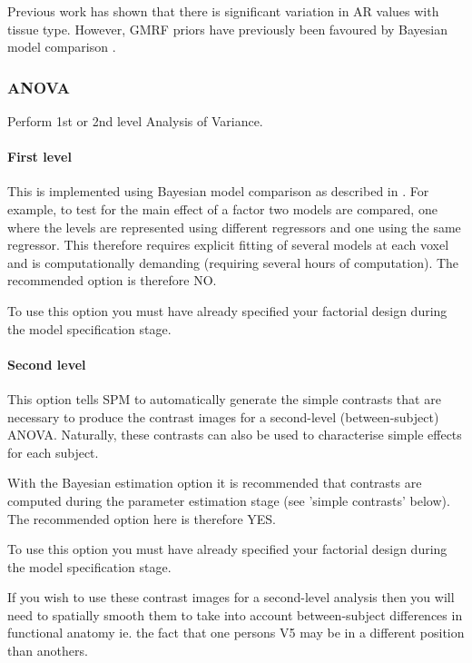 Previous work has shown that there is significant variation in AR values with tissue type. However, GMRF priors have previously been favoured by Bayesian model comparison \cite{will_bayes_srglm}.

\subsubsection{ANOVA}

Perform 1st or 2nd level Analysis of Variance.

\paragraph{First level}

This is implemented using Bayesian model comparison as described in \cite{will_bayes_srglm}. For example, to test for the main effect of a factor two models are compared, one where the levels are represented using different regressors and one using the same regressor. This therefore requires explicit fitting of several models at each voxel and is computationally demanding (requiring several hours of computation). The recommended option is therefore NO.

To use this option you must have already specified your factorial design during the model specification stage. 

\paragraph{Second level}

This option tells SPM to automatically generate the simple contrasts that are necessary to produce the contrast images for a second-level (between-subject) ANOVA. Naturally, these contrasts can also be used to characterise simple effects for each subject. 

With the Bayesian estimation option it is recommended that contrasts are computed during the parameter estimation stage (see 'simple contrasts' below). The recommended option here is therefore YES.

To use this option you must have already specified your factorial design during the model specification stage. 

If you wish to use these contrast images for a second-level analysis then you will need to spatially smooth them to take into account between-subject differences in functional anatomy ie. the fact that one persons V5 may be in a different position than anothers. 


